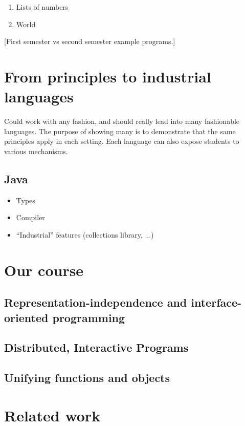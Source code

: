 \documentclass[submission,copyright]{eptcs}
\begin{document}
\begin{enumerate}
\item Lists of numbers
\item World
\end{enumerate}



[First semester vs second semester example programs.]

\section{From principles to industrial languages}

Could work with any fashion, and should really lead into many
fashionable languages.  The purpose of showing many is to demonstrate
that the same principles apply in each setting.  Each language can also
expose students to various mechanisms.

\subsection{Java}

\begin{itemize}
\item Types
\item Compiler
\item ``Industrial'' features (collections library, ...)
\end{itemize}



\section{Our course}
\label{sec:our-course}

\subsection{Representation-independence and interface-oriented programming}

\subsection{Distributed, Interactive Programs}

\subsection{Unifying functions and objects}


\section{Related work}
\end{document}
